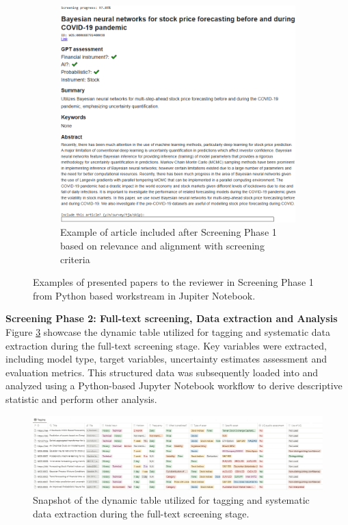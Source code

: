 \begin{figure}[H]
\begin{subfigure}[b]{0.49\textwidth}
         \includegraphics[width=\textwidth]{Images/screening_b2.png}
         \caption{Example of article included after Screening Phase 1 based on relevance and alignment with screening criteria}
         \label{fig:screening_phase_1_included}
     \end{subfigure}
      \caption{Examples of presented papers to the reviewer in Screening Phase 1 from Python based workstream in Jupiter Notebook.}
    \label{fig:screening_process_phase_1}
\end{figure}

\textbf{Screening Phase 2: Full-text screening, Data extraction and Analysis} \\
Figure \ref{fig:screening_process_phase_2}  showcase the dynamic table utilized for tagging and systematic data extraction during the full-text screening stage. Key variables were extracted, including model type, target variables, uncertainty estimates assessment and evaluation metrics. This structured data was subsequently loaded into and analyzed using a Python-based  Jupyter Notebook workflow to derive descriptive statistic and perform other analysis.
\begin{figure}[H]
    \centering
    \includegraphics[width=1\linewidth]{Images/screening_process_phase_2.png}
    \caption{Snapshot of the dynamic table utilized for tagging and systematic data extraction during the full-text screening stage.}
    \label{fig:screening_process_phase_2}
\end{figure}


